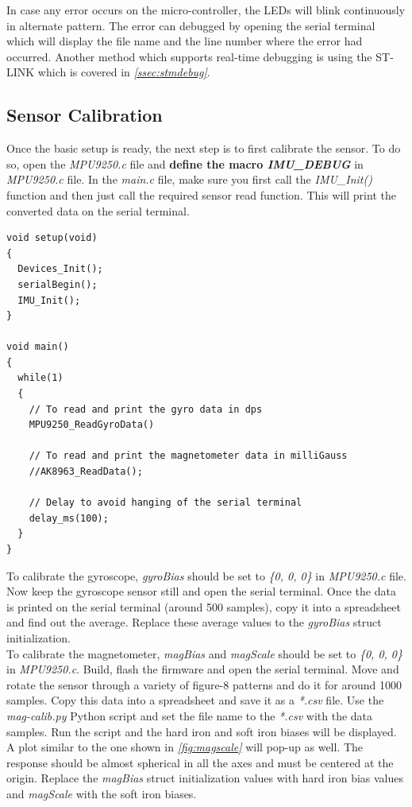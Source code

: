 \documentclass[a4paper,12pt,oneside]{book}
\begin{document}
In case any error occurs on the micro-controller, the LEDs will blink continuously in alternate pattern. The error can debugged by opening the serial terminal which will display the file name and the line number where the error had occurred. Another method which supports real-time debugging is using the ST-LINK which is covered in \textit{\autoref{ssec:stmdebug}}.\\

\subsection{Sensor Calibration}
Once the basic setup is ready, the next step is to first calibrate the sensor. To do so, open the \textit{MPU9250.c} file and \textbf{define the macro \textit{IMU{\_}DEBUG}} in \textit{MPU9250.c} file. In the \textit{main.c} file, make sure you first call the \textit{IMU{\_}Init()} function and then just call the required sensor read function. This will print the converted data on the serial terminal.\\ 

\begin{verbatim}
void setup(void)
{
  Devices_Init();
  serialBegin();
  IMU_Init();
}

void main()
{
  while(1)
  {
    // To read and print the gyro data in dps
    MPU9250_ReadGyroData()
  
    // To read and print the magnetometer data in milliGauss
    //AK8963_ReadData();
  
    // Delay to avoid hanging of the serial terminal
    delay_ms(100);
  }
}
\end{verbatim}

\bigskip

To calibrate the gyroscope, \textit{gyroBias} should be set to \textit{\{0, 0, 0\}} in \textit{MPU9250.c} file. Now keep the gyroscope sensor still and open the serial terminal. Once the data is printed on the serial terminal (around 500 samples), copy it into a spreadsheet and find out the average. Replace these average values to the \textit{gyroBias} struct initialization.\\

To calibrate the magnetometer, \textit{magBias} and \textit{magScale} should be set to \textit{\{0, 0, 0\}} in \textit{MPU9250.c}. Build, flash the firmware and open the serial terminal. Move and rotate the sensor through a variety of figure-8 patterns and do it for around 1000 samples. Copy this data into a spreadsheet and save it as a \textit{*.csv} file. Use the \textit{mag-calib.py} Python script and set the file name to the \textit{*.csv} with the data samples. Run the script and the hard iron and soft iron biases will be displayed. A plot similar to the one shown in \textit{\autoref{fig:magscale}} will pop-up as well. The response should be almost spherical in all the axes and must be centered at the origin. Replace the \textit{magBias} struct initialization values with hard iron bias values and \textit{magScale} with the soft iron biases.\\
\end{document}
